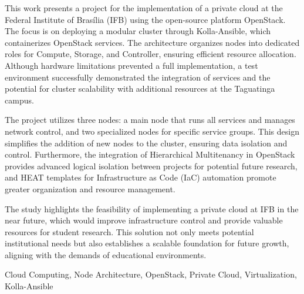This work presents a project for the implementation of a private cloud at the Federal Institute of Brasília (IFB) using the open-source platform OpenStack. The focus is on deploying a modular cluster through Kolla-Ansible, which containerizes OpenStack services. The architecture organizes nodes into dedicated roles for Compute, Storage, and Controller, ensuring efficient resource allocation. Although hardware limitations prevented a full implementation, a test environment successfully demonstrated the integration of services and the potential for cluster scalability with additional resources at the Taguatinga campus.

The project utilizes three nodes: a main node that runs all services and manages network control, and two specialized nodes for specific service groups. This design simplifies the addition of new nodes to the cluster, ensuring data isolation and control. Furthermore, the integration of Hierarchical Multitenancy in OpenStack provides advanced logical isolation between projects for potential future research, and HEAT templates for Infrastructure as Code (IaC) automation promote greater organization and resource management.

The study highlights the feasibility of implementing a private cloud at IFB in the near future, which would improve infrastructure control and provide valuable resources for student research. This solution not only meets potential institutional needs but also establishes a scalable foundation for future growth, aligning with the demands of educational environments.

\begin{keywords}
Cloud Computing, Node Architecture, OpenStack, Private Cloud, Virtualization, Kolla-Ansible
\end{keywords}